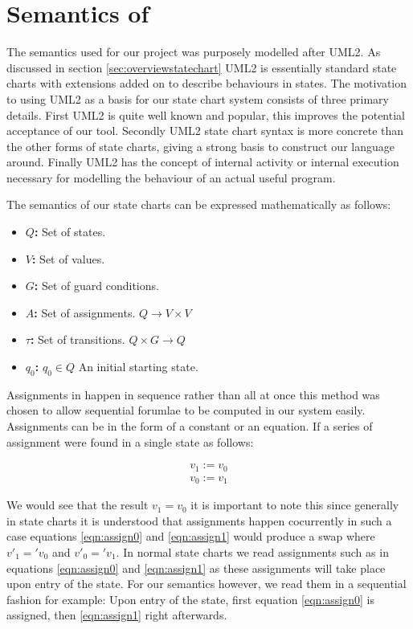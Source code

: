 \section{Semantics of \plcchart}

The semantics used for our project was purposely modelled after UML2. As discussed in section \ref{sec:overviewstatechart} UML2 is essentially standard state charts with extensions added on to describe behaviours in states. The motivation to using UML2 as a basis for our state chart system consists of three primary details. First UML2 is quite well known and popular, this improves the potential acceptance of our tool. Secondly UML2 state chart syntax is more concrete than the other forms of state charts, giving a strong basis to construct our language around. Finally UML2 has the concept of internal activity or internal execution necessary for modelling the behaviour of an actual useful program.

The semantics of our state charts can be expressed mathematically as follows:

\begin{itemize}
	\item \textbf{$Q$:} Set of states.
	\item \textbf{$V$:} Set of values.
	\item \textbf{$G$:} Set of guard conditions.
	\item \textbf{$A$:} Set of assignments. $Q \rightarrow V \times V$
	\item \textbf{$\tau$:} Set of transitions. $Q \times G \rightarrow Q$
	\item \textbf{$q_0$:} $q_0 \in Q$ An initial starting state.
\end{itemize}

Assignments in \plccharts happen in sequence rather than all at once this method was chosen to allow sequential forumlae to be computed in our system easily. Assignments can be in the form of a constant or an equation. If a series of assignment were found in a single state as follows:

\begin{align}
v_1 := v_0 \label{eqn:assign0} \\ 
v_0 := v_1 \label{eqn:assign1}
\end{align}

We would see that the result $v_1 = v_0$ it is important to note this since generally in state charts it is understood that assignments happen cocurrently in such a case equations \ref{eqn:assign0} and \ref{eqn:assign1} would produce a swap where $v'_1 = 'v_0$ and $v'_0 = 'v_1$. In normal state charts we read assignments such as in equations \ref{eqn:assign0} and \ref{eqn:assign1} as these assignments will take place upon entry of the state. For our semantics however, we read them in a sequential fashion for example: Upon entry of the state, first equation \ref{eqn:assign0} is assigned, then \ref{eqn:assign1} right afterwards.

